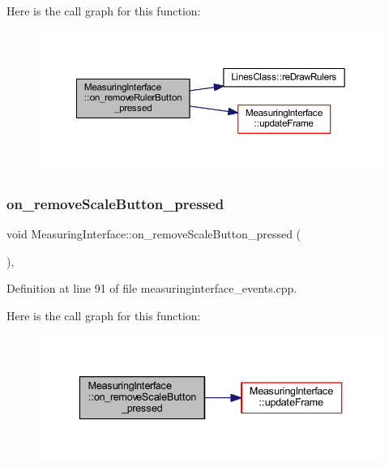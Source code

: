 Here is the call graph for this function\+:
\nopagebreak
\begin{figure}[H]
\begin{center}
\leavevmode
\includegraphics[width=350pt]{classMeasuringInterface_a23015fd17f84f8b656cbf4e352b02604_cgraph}
\end{center}
\end{figure}
\mbox{\label{classMeasuringInterface_ac406b351a7162743198aa64bbc2a9c46}} 
\subsubsection{\texorpdfstring{on\_removeScaleButton\_pressed}{on\_removeScaleButton\_pressed}}
{\footnotesize\ttfamily void Measuring\+Interface\+::on\+\_\+remove\+Scale\+Button\+\_\+pressed (\begin{DoxyParamCaption}{ }\end{DoxyParamCaption})\hspace{0.3cm}{\ttfamily [private]}, {\ttfamily [slot]}}



Definition at line 91 of file measuringinterface\+\_\+events.\+cpp.

Here is the call graph for this function\+:
\nopagebreak
\begin{figure}[H]
\begin{center}
\leavevmode
\includegraphics[width=336pt]{classMeasuringInterface_ac406b351a7162743198aa64bbc2a9c46_cgraph}
\end{center}
\end{figure}
\mbox{\label{classMeasuringInterface_a87fcf4623df1c9af6663fe236bb3dd0e}} 
